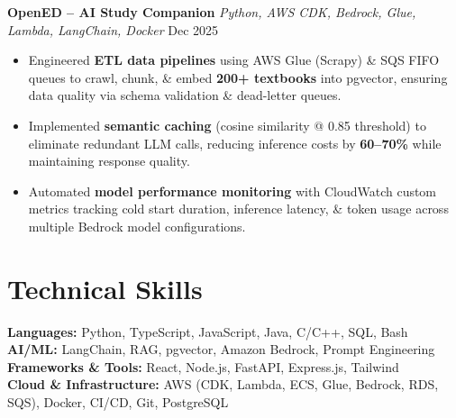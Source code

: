 \textbf{OpenED -- AI Study Companion} \quad \textit{Python, AWS CDK, Bedrock, Glue, Lambda, LangChain, Docker} \hfill Dec 2025
\begin{itemize}[nosep, leftmargin=1.5em, itemsep=2pt]
    \item Engineered \textbf{ETL data pipelines} using AWS Glue (Scrapy) \& SQS FIFO queues to crawl, chunk, \& embed \textbf{200+ textbooks} into pgvector, ensuring data quality via schema validation \& dead-letter queues.
    \item Implemented \textbf{semantic caching} (cosine similarity @ 0.85 threshold) to eliminate redundant LLM calls, reducing inference costs by \textbf{60--70\%} while maintaining response quality.
    \item Automated \textbf{model performance monitoring} with CloudWatch custom metrics tracking cold start duration, inference latency, \& token usage across multiple Bedrock model configurations.
\end{itemize}

\section{Technical Skills}
\textbf{Languages:} Python, TypeScript, JavaScript, Java, C/C++, SQL, Bash \\
\textbf{AI/ML:} LangChain, RAG, pgvector, Amazon Bedrock, Prompt Engineering \\
\textbf{Frameworks \& Tools:} React, Node.js, FastAPI, Express.js, Tailwind \\
\textbf{Cloud \& Infrastructure:} AWS (CDK, Lambda, ECS, Glue, Bedrock, RDS, SQS), Docker, CI/CD, Git, PostgreSQL



